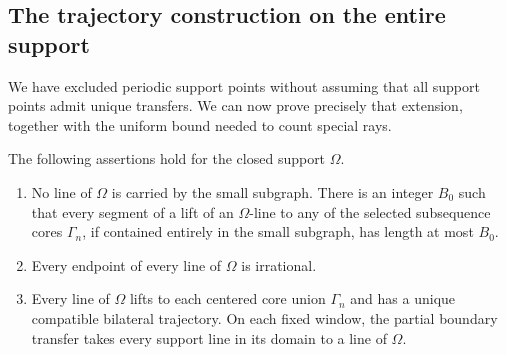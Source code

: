 \subsection{The trajectory construction on the entire support}

We have excluded periodic support points without assuming that all
support points admit unique transfers. We can now prove precisely
that extension, together with the uniform bound needed to count
special rays.

\begin{corollary}
\label{exp:support}
The following assertions hold for the closed support $\Omega$.
\begin{enumerate}
 \item No line of $\Omega$ is carried by the small subgraph.
 There is an integer $B_0$ such that every segment of a lift of
 an $\Omega$-line to any of the selected subsequence cores
 $\Gamma_n$, if contained entirely in the small subgraph, has
 length at most $B_0$.
 \item Every endpoint of every line of $\Omega$ is irrational.
 \item Every line of $\Omega$ lifts to each centered core union $\Gamma_n$
 and has a unique compatible bilateral trajectory. On each
 fixed window, the partial boundary transfer takes every
 support line in its domain to a line of $\Omega$.
\end{enumerate}
\end{corollary}

